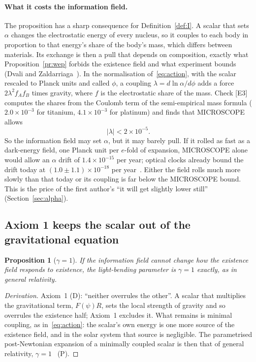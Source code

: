 \documentclass[11pt,a4paper]{article}
\newtheorem{proposition}{Proposition}
\theoremstyle{definition}
\theoremstyle{remark}
\newcommand{\chk}[1]{\textsf{[#1]}}
\newcommand{\tagD}{\textsf{(D)}}
\newcommand{\tagP}{\textsf{(P)}}
\begin{document}
\paragraph{What it costs the information field.} The proposition has a sharp consequence for Definition~\ref{def:I}. A scalar that
sets $\alpha$ changes the electrostatic energy of every nucleus, so it couples to each body in proportion to that energy's share of the
body's mass, which differs between materials. Its exchange is then a pull that depends on composition, exactly what
Proposition~\ref{pr:wep} forbids the existence field and what experiment bounds (Dvali and Zaldarriaga~\cite{dz}). In the normalisation
of~\eqref{eq:action}, with the scalar rescaled to Planck units and called $\phi$, a coupling $\lambda=d\ln\alpha/d\phi$ adds a force $2\lambda^2 f_Af_B$ times gravity,
where $f$ is the electrostatic share of the mass. Check \chk{E3} computes the shares from the Coulomb term of the semi-empirical mass
formula ($2.0\times10^{-3}$ for titanium, $4.1\times10^{-3}$ for platinum) and finds that MICROSCOPE allows
\[
|\lambda|<2\times10^{-5}.
\]
So the information field may set $\alpha$, but it may barely pull. If it rolled as fast as a dark-energy field, one Planck unit per
$e$-fold of expansion, MICROSCOPE alone would allow an $\alpha$ drift of $1.4\times10^{-15}$ per year; optical clocks already bound the
drift today at $(1.0\pm1.1)\times10^{-18}$ per year~\cite{lange}. Either the field rolls much more slowly than that today or its coupling
is far below the MICROSCOPE bound. This is the price of the first author's ``it will get slightly lower still'' (Section~\ref{sec:alpha}).

\subsection{Axiom 1 keeps the scalar out of the gravitational equation}\label{sec:gamma}

\begin{proposition}[$\gamma=1$]\label{pr:gamma}
If the information field cannot change how the existence field responds to existence, the light-bending parameter is $\gamma=1$ exactly,
as in general relativity.
\end{proposition}

\begin{proof}[Derivation]
Axiom~1 \tagD: ``neither overrules the other''. A scalar that multiplies the gravitational term, $F(\psi)R$, sets the local strength of
gravity and so overrules the existence half; Axiom~1 excludes it. What remains is minimal coupling, as in~\eqref{eq:action}: the scalar's
own energy is one more source of the existence field, and in the solar system that source is negligible. The parametrised post-Newtonian
expansion of a minimally coupled scalar is then that of general relativity, $\gamma=1$~\cite{will} \tagP.
\end{proof}
\end{document}
